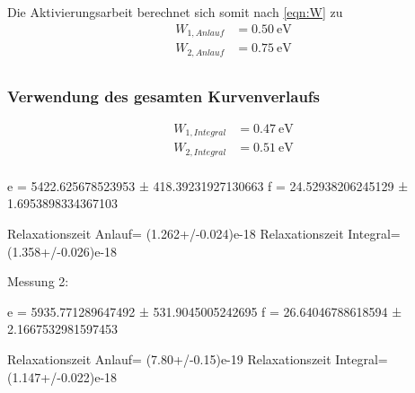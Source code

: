 Die Aktivierungsarbeit berechnet sich somit nach \autoref{eqn:W} zu
\begin{align*}
  W_{1,Anlauf} &= \qty{0.50}{\electronvolt}\\
  W_{2,Anlauf} &= \qty{0.75}{\electronvolt}\\
\end{align*} 

\subsubsection{Verwendung des gesamten Kurvenverlaufs}

\begin{align*}
  W_{1,Integral} &= \qty{0.47}{\electronvolt}\\
  W_{2,Integral} &= \qty{0.51}{\electronvolt}\\
\end{align*} 

e = 5422.625678523953 ± 418.39231927130663
f = 24.52938206245129 ± 1.6953898334367103

Relaxationszeit Anlauf= (1.262+/-0.024)e-18
Relaxationszeit Integral= (1.358+/-0.026)e-18

Messung 2:

e = 5935.771289647492 ± 531.9045005242695
f = 26.64046788618594 ± 2.1667532981597453

Relaxationszeit Anlauf= (7.80+/-0.15)e-19
Relaxationszeit Integral= (1.147+/-0.022)e-18
